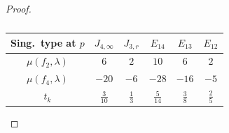 \documentclass[11pt]{amsart}
\numberwithin{equation}{section}
\theoremstyle{plain}
\theoremstyle{remark}
\theoremstyle{definition}
\begin{document}
\begin{proof}
%

 \begin{table}[htb!]
\renewcommand\arraystretch{1.5}
\begin{tabular}{|c|c|c|c|c|c|}
\hline
 Sing.~type at $p$&$J_{4,\infty}$&$J_{3,r}$&$E_{14}$&$E_{13}$&$E_{12}$\\
 \hline
 $\mu(f_2,\lambda)$ &$6$& $2$ & $10$ &$6$ &  $2$\\
 \hline
$\mu(f_4,\lambda)$&  $-20$&  $-6$ & $-28$ &  $-16$ &  $-5$ \\
\hline
$t_k$&$\frac{3}{10}$&$\frac{1}{3}$&$\frac{5}{14}$&$\frac{3}{8}$&$\frac{2}{5}$\\
%
\hline
\end{tabular}
\vspace{0.2cm}
\caption{}\label{pendenze}
\end{table}

%
\end{proof}
%


%
\end{document}
